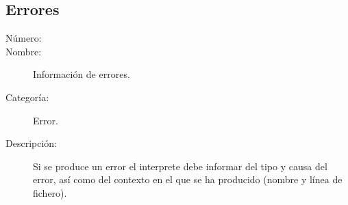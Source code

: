 \subsection{Errores}
\begin{framed}
	\begin{description}
		\item [Número:] \cn
		\item [Nombre:] Información de errores.
		\item [Categoría:] Error.
		\item [Descripción:] Si se produce un error el interprete debe informar del tipo y causa del error, así como del contexto en el que se
		ha producido (nombre y línea de fichero).
	\end {description}
\end{framed}
